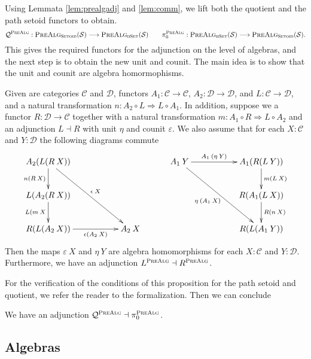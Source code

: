 \documentclass[9pt]{entcs}
\newcommand{\type}[1]{\textsc{#1}}
\newcommand{\category}[1]{\textsc{#1}}
\newcommand{\hset}{\type{hSet}} %
\newcommand{\0}{\textbf{0}} %
\newcommand{\setoids}{\category{Setoid}} %
\newcommand{\functor}[2]{#1 \longrightarrow #2} %
\newcommand{\compf}[2]{#2 \circ #1} %
\newcommand{\nattrans}[2]{#1 \Longrightarrow #2} %
\newcommand{\adj}[2]{#1 \dashv #2} %
\newcommand{\sig}{\mathcal{S}} %
\newcommand{\prealg}[1]{\category{PreAlg}_{\hset}(#1)} %
\newcommand{\prealgst}[1]{\category{PreAlg}_{\setoids}(#1)} %
\newcommand{\quotPA}{\mathcal{Q}^{\category{PreAlg}}}
\newcommand{\pathPA}{\pi^{\category{PreAlg}}_0}
\begin{document}
Using Lemmata \ref{lem:prealgadj} and \ref{lem:comm}, we lift both the quotient and the path setoid functors to obtain.
\[
\quotPA : \functor{\prealgst{\sig}}{\prealg{\sig}}
\quad \quad
\pathPA : \functor{\prealg{\sig}}{\prealgst{\sig}}.
\]
This gives the required functors for the adjunction on the level of algebras, and the next step is to obtain the new unit and counit.
The main idea is to show that the unit and counit are algebra homormophisms.

\begin{proposition}
\label{lem:prealgadjconstr}
Given are categories $\mathcal{C}$ and $\mathcal{D}$, functors $A_1 : \functor{\mathcal{C}}{\mathcal{C}}$, $A_2 : \functor{\mathcal{D}}{\mathcal{D}}$, and $L : \functor{\mathcal{C}}{\mathcal{D}}$, and a natural transformation $n : \nattrans{\compf{L}{A_2}}{\compf{A_1}{L}}$.
In addition, suppose we a functor $R : \functor{\mathcal{D}}{\mathcal{C}}$ together with a natural transformation $m : \nattrans{\compf{R}{A_1}}{\compf{A_2}{L}}$ and an adjunction $\adj{L}{R}$ with unit $\eta$ and counit $\varepsilon$.
We also assume that for each $X : \mathcal{C}$ and $Y : \mathcal{D}$ the following diagrams commute
\[
\xymatrix
{	
	A_2 (L(R \> X)) \ar[ddrr]^{\epsilon \> X} \ar[d]_{n(R \> X)} \\
	L(A_2(R \> X)) \ar[d]_{L(m \> X} \\
	R(L(A_2 \> X)) \ar[rr]_-{\epsilon(A_2 \> X)} & & A_2 \> X
}
\quad \quad \quad
\xymatrix
{
	A_1 \> Y \ar[ddrr]_{\eta \> (A_1 \> X)} \ar[rr]^-{A_1 \> (\eta \> Y)} & & A_1(R(L \> Y)) \ar[d]^{m(L \> X)}\\
	& & R(A_1(L \> X)) \ar[d]^{R(n \> X)}\\
	& & R(L(A_1 \> Y))
}
\]
Then the maps $\varepsilon \> X$ and $\eta \> Y$ are algebra homomorphisms for each $X : \mathcal{C}$ and $Y : \mathcal{D}$.
Furthermore, we have an adjunction $\adj{L^{\category{PreAlg}}}{R^{\category{PreAlg}}}$.
\end{proposition}

For the verification of the conditions of this proposition for the path setoid and quotient, we refer the reader to the formalization.
Then we can conclude

\begin{lemma}
\label{lem:adjprealg}
We have an adjunction $\adj{\quotPA}{\pathPA}$.
\end{lemma}

\subsection{Algebras}
\end{document}
